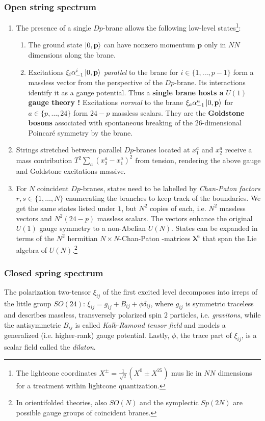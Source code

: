 \subsubsection{Open string spectrum}
\begin{enumerate}
	\item The presence of a single $Dp$-brane allows the following low-level states\footnote{The lightcone coordinates $X^\pm=\frac{1}{\sqrt{2}}(X^0 \pm X^{25}) $ mus lie in $NN$ dimensions for a treatment within lightcone quantization. }:
	\begin{enumerate}
		\item The ground state $\ket{0,\mathbf{p}}$ can have nonzero momentum $\mathbf{p}$ only in $NN$ dimensions along the brane.
		\item Excitations $\xi_i \alpha^i_{-1}\ket{0,\mathbf{p}}$ \emph{parallel} to the brane for $i\in \{1,\dots,p-1\}$ form a massless vector from the perspective of the $Dp$-brane. Its interactions identify it as a gauge potential. Thus a \textbf{single brane hosts a }$U(1)$ \textbf{ gauge theory !} Excitations \emph{normal} to the brane $\xi_a \alpha^a_{-1} \ket{0,\mathbf{p}}$ for $a\in \{p,\dots,24 \}$ form $24-p$ massless scalars. They are the \textbf{Goldstone bosons} associated with spontaneous breaking of the $26$-dimensional Poincaré symmetry by the brane.
	\end{enumerate}
\item Strings stretched between parallel $Dp$-branes located at $x^a_1$ and $x^a_2$ receive a mass contribution $T^2 \sum_a (x^a_2-x^a_1)^2$ from tension, rendering the above gauge and Goldstone excitations massive.
\item For $N$ coincident $Dp$-branes, states need to be labelled by \emph{Chan-Paton factors} $r,s\in \{1,\dots,N\}$ enumerating the branches to keep track of the boundaries. We get the same states listed under $1$, but $N^2$ copies of each, i.e. $N^2$ massless vectors and $N^2(24-p)$ massless scalars. The vectors enhance the original $U(1)$ gauge symmetry to a non-Abelian $U(N)$. States can be expanded in terms of the $N^2$ hermitian $N\times N$-Chan-Paton -matrices $\mathbf{\lambda}^a$ that span the Lie algebra of $U(N)$.\footnote{In orientifolded theories, also $SO(N)$ and the symplectic $Sp(2N)$ are possible gauge groups of coincident branes.}
\end{enumerate}
\subsubsection{Closed spring spectrum}
The polarization two-tensor $\xi_{ij}$ of the first excited level decomposes into irreps of the little group $SO(24)$: $\xi_{ij}=g_{ij}+B_{ij}+\phi \delta_{ij}$, where $g_{ij}$ is symmetric traceless and describes massless, transversely polarized spin $2$ particles, i.e. \emph{gravitons}, while the antisymmetric $B_{ij}$ is called \emph{Kalb-Ramond tensor field} and models a generalized (i.e. higher-rank) gauge potential. Lastly, $\phi$, the trace part of $\xi_{ij}$, is a scalar field called the \emph{dilaton}.

